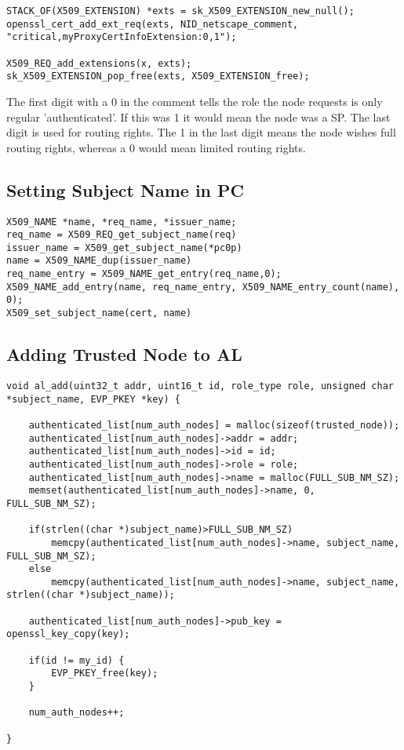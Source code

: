 \begin{lstlisting}[frame=tb]
STACK_OF(X509_EXTENSION) *exts = sk_X509_EXTENSION_new_null();
openssl_cert_add_ext_req(exts, NID_netscape_comment, "critical,myProxyCertInfoExtension:0,1");

X509_REQ_add_extensions(x, exts);
sk_X509_EXTENSION_pop_free(exts, X509_EXTENSION_free);
\end{lstlisting}

The first digit with a 0 in the comment tells the role the node requests is only
regular 'authenticated'. If this was  1 it would mean the node was a SP. The
last digit is used for routing rights. The 1 in the last digit means the node
wishes full routing rights, whereas a 0 would mean limited routing rights.

\subsection{Setting Subject Name in PC}\label{code:set_subject_name}
\begin{lstlisting}[frame=tb]
X509_NAME *name, *req_name, *issuer_name;
req_name = X509_REQ_get_subject_name(req)
issuer_name = X509_get_subject_name(*pc0p)
name = X509_NAME_dup(issuer_name)
req_name_entry = X509_NAME_get_entry(req_name,0);
X509_NAME_add_entry(name, req_name_entry, X509_NAME_entry_count(name), 0);
X509_set_subject_name(cert, name)
\end{lstlisting}

\subsection{Adding Trusted Node to AL}\label{code:add_to_al}
\begin{lstlisting}[frame=tb]
void al_add(uint32_t addr, uint16_t id, role_type role, unsigned char *subject_name, EVP_PKEY *key) {

	authenticated_list[num_auth_nodes] = malloc(sizeof(trusted_node));
	authenticated_list[num_auth_nodes]->addr = addr;
	authenticated_list[num_auth_nodes]->id = id;
	authenticated_list[num_auth_nodes]->role = role;
	authenticated_list[num_auth_nodes]->name = malloc(FULL_SUB_NM_SZ);
	memset(authenticated_list[num_auth_nodes]->name, 0, FULL_SUB_NM_SZ);

	if(strlen((char *)subject_name)>FULL_SUB_NM_SZ)
		memcpy(authenticated_list[num_auth_nodes]->name, subject_name, FULL_SUB_NM_SZ);
	else
		memcpy(authenticated_list[num_auth_nodes]->name, subject_name, strlen((char *)subject_name));

	authenticated_list[num_auth_nodes]->pub_key = openssl_key_copy(key);

	if(id != my_id) {
		EVP_PKEY_free(key);
	}

	num_auth_nodes++;

}
\end{lstlisting}

